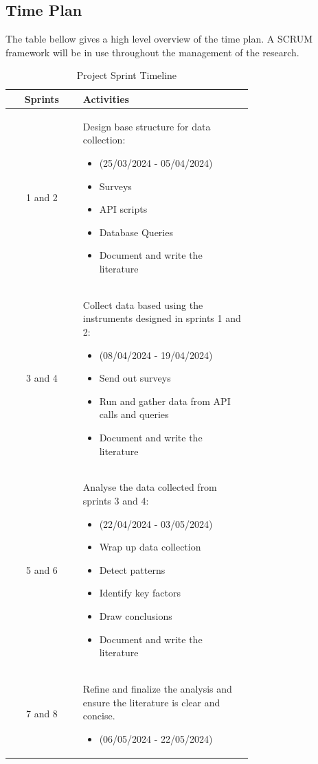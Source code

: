 \documentclass[conference]{IEEEtran}
\begin{document}
    \subsection{Time Plan}
        The table bellow gives a high level overview of the time plan. A SCRUM framework will be in use throughout the management of the research. 
        \begin{table}[h]
            \centering
            \caption{Project Sprint Timeline}
            \label{tab:sprint_timeline}
            \begin{tabular}{|c|p{0.7\linewidth}|}
            \hline
            \textbf{Sprints} & \textbf{Activities} \\ \hline
            1 and 2  & Design base structure for data collection:
            \begin{itemize}
	      \item (25/03/2024 - 05/04/2024)
                \item Surveys
                \item API scripts
                \item Database Queries
                \item Document and write the literature
            \end{itemize} \\ \hline
            3 and 4  & Collect data based using the instruments designed in sprints 1 and 2:
            \begin{itemize}
                \item  (08/04/2024 - 19/04/2024) 
                \item Send out surveys
                \item Run and gather data from API calls and queries
                \item Document and write the literature
            \end{itemize} \\ \hline
            5 and 6   & Analyse the data collected from sprints 3 and 4:
            \begin{itemize}
                \item(22/04/2024 - 03/05/2024)
                \item Wrap up data collection
                \item Detect patterns
                \item Identify key factors
                \item Draw conclusions
                \item Document and write the literature
            \end{itemize} \\ \hline
            7 and 8   & Refine and finalize the analysis and ensure the literature is clear and concise. 
	  \begin{itemize}
                \item(06/05/2024 - 22/05/2024)
            \end{itemize} \\ \hline
            \end{tabular}
        \end{table}
\end{document}
